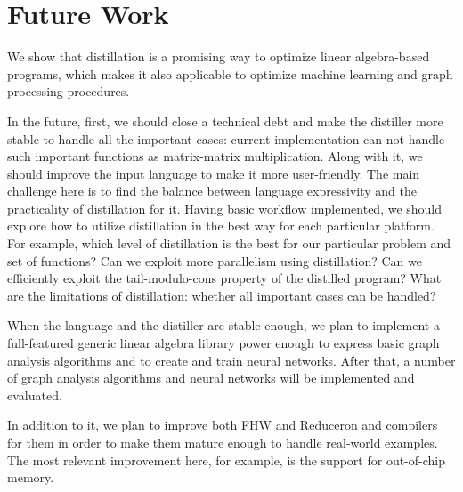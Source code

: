 \section{Future Work}

We show that distillation is a promising way to optimize linear algebra-based programs, which makes it also applicable to optimize machine learning and graph processing procedures.

In the future, first, we should close a technical debt and make the distiller more stable to handle all the important cases: current implementation can not handle such important functions as matrix-matrix multiplication.
Along with it, we should improve the input language to make it more user-friendly.
The main challenge here is to find the balance between language expressivity and the practicality of distillation for it.
Having basic workflow implemented, we should explore how to utilize distillation in the best way for each particular platform. 
For example, which level of distillation is the best for our particular problem and set of functions?
Can we exploit more parallelism using distillation?
Can we efficiently exploit the tail-modulo-cons property of the distilled program?
What are the limitations of distillation: whether all important cases can be handled?

When the language and the distiller are stable enough, we plan to implement a full-featured generic linear algebra library power enough to express basic graph analysis algorithms and to create and train neural networks.
After that, a number of graph analysis algorithms and neural networks will be implemented and evaluated.

In addition to it, we plan to improve both FHW and Reduceron and compilers for them in order to make them mature enough to handle real-world examples.
The most relevant improvement here, for example, is the support for out-of-chip memory.